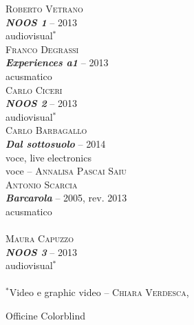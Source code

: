 \documentclass[9pt, twoside, a5paper]{extreport}
\newcommand{\brano}[6]{%
\noindent \textsc{#1}\\ %
\noindent \textbf{\textit{#2}} -- #3\\%
\noindent #4\\ %
\noindent #5 -- \textsc{#6}%
\\
}%
\newcommand{\installazione}[4]{%
\noindent \textsc{#1}\\ %
\noindent \textbf{\textit{#2}} -- #3\\%
\noindent #4%
\\
}%
\begin{document}
\begin{multicols}{2}


\installazione{Roberto Vetrano}
{NOOS 1}{2013}
{audiovisual$^\ast$}

\installazione{Franco Degrassi}
{Experiences a1}{2013}
{acusmatico}

\installazione{Carlo Ciceri}
{NOOS 2}{2013}
{audiovisual$^\ast$}

\brano{Carlo Barbagallo}
{Dal sottosuolo}{2014}
{voce, live electronics}
{voce}{Annalisa Pascai Saiu}

\installazione{Antonio Scarcia}
{Barcarola}{2005, rev. 2013 }
{acusmatico}
\\

\installazione{Maura Capuzzo}
{NOOS 3}{2013}
{audiovisual$^\ast$}
\\

\noindent $^\ast$Video e graphic video -- \textsc{Chiara Verdesca},

\noindent Officine Colorblind
\\
\medskip


\end{multicols}
\end{document}
